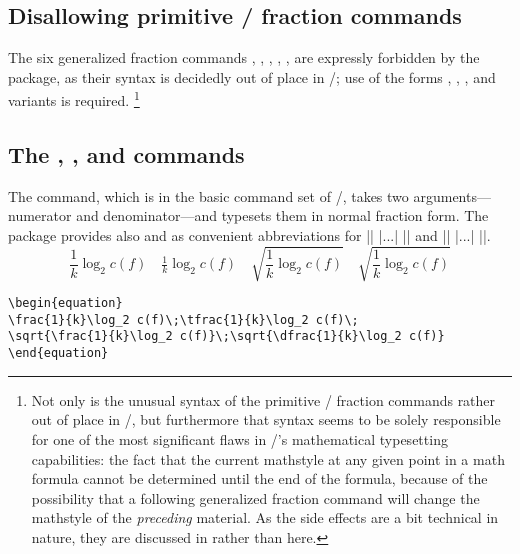 \documentclass[leqno,titlepage,openany]{amsldoc}
\begin{document}
\subsection{Disallowing primitive \tex/ fraction
  commands}\label{badgfrac}

The six generalized fraction commands , ,
, , ,  are
expressly forbidden by the  package, as their syntax is
decidedly out of place in \latex/; use of the forms ,
, , and variants is required.%
\footnote{%
Not only is the unusual syntax of the primitive \tex/ fraction commands
rather out of place in \latex/, but furthermore that syntax seems to be
solely responsible for one of the most significant flaws in \tex/'s
mathematical typesetting capabilities: the fact that the current
mathstyle at any given point in a math formula cannot be determined
until the end of the formula, because of the possibility that a
following generalized fraction command will change the mathstyle of the
\emph{preceding} material. As the side effects are a bit technical in
nature, they are discussed in  rather than here.}

\subsection{The , , and  commands}

The  command, which is in the basic command set of
\latex/, takes two arguments---numerator and
denominator---and typesets them in normal fraction form. The
 package provides also  and  as
convenient abbreviations for |{\displaystyle\frac| |...| |}|
and\relax
{} |{\textstyle\frac| |...| |}|.
\begin{equation}
\frac{1}{k}\log_2 c(f)\quad\tfrac{1}{k}\log_2 c(f)\quad
\sqrt{\frac{1}{k}\log_2 c(f)}\quad\sqrt{\dfrac{1}{k}\log_2 c(f)}
\end{equation}
\begin{verbatim}
\begin{equation}
\frac{1}{k}\log_2 c(f)\;\tfrac{1}{k}\log_2 c(f)\;
\sqrt{\frac{1}{k}\log_2 c(f)}\;\sqrt{\dfrac{1}{k}\log_2 c(f)}
\end{equation}
\end{verbatim}
\end{document}
